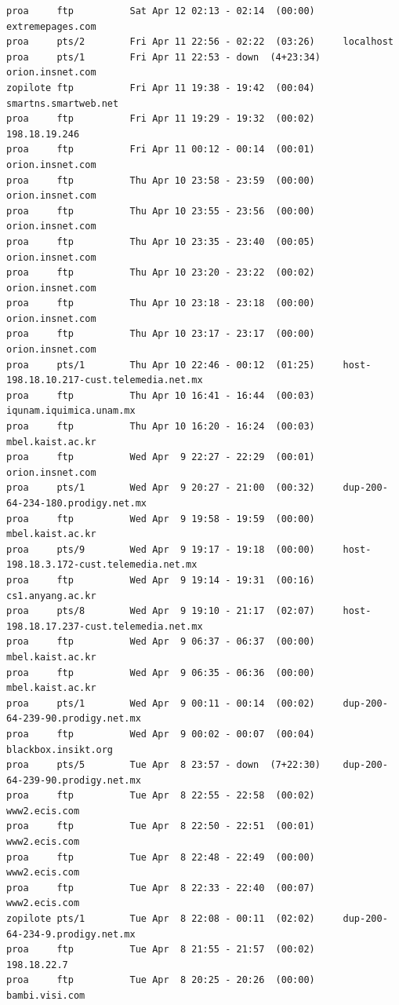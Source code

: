 \begin{lstlisting}[style=terminal]
proa     ftp          Sat Apr 12 02:13 - 02:14  (00:00)     extremepages.com
proa     pts/2        Fri Apr 11 22:56 - 02:22  (03:26)     localhost
proa     pts/1        Fri Apr 11 22:53 - down  (4+23:34)    orion.insnet.com
zopilote ftp          Fri Apr 11 19:38 - 19:42  (00:04)     smartns.smartweb.net
proa     ftp          Fri Apr 11 19:29 - 19:32  (00:02)     198.18.19.246
proa     ftp          Fri Apr 11 00:12 - 00:14  (00:01)     orion.insnet.com
proa     ftp          Thu Apr 10 23:58 - 23:59  (00:00)     orion.insnet.com
proa     ftp          Thu Apr 10 23:55 - 23:56  (00:00)     orion.insnet.com
proa     ftp          Thu Apr 10 23:35 - 23:40  (00:05)     orion.insnet.com
proa     ftp          Thu Apr 10 23:20 - 23:22  (00:02)     orion.insnet.com
proa     ftp          Thu Apr 10 23:18 - 23:18  (00:00)     orion.insnet.com
proa     ftp          Thu Apr 10 23:17 - 23:17  (00:00)     orion.insnet.com
proa     pts/1        Thu Apr 10 22:46 - 00:12  (01:25)     host-198.18.10.217-cust.telemedia.net.mx
proa     ftp          Thu Apr 10 16:41 - 16:44  (00:03)     iqunam.iquimica.unam.mx
proa     ftp          Thu Apr 10 16:20 - 16:24  (00:03)     mbel.kaist.ac.kr
proa     ftp          Wed Apr  9 22:27 - 22:29  (00:01)     orion.insnet.com
proa     pts/1        Wed Apr  9 20:27 - 21:00  (00:32)     dup-200-64-234-180.prodigy.net.mx
proa     ftp          Wed Apr  9 19:58 - 19:59  (00:00)     mbel.kaist.ac.kr
proa     pts/9        Wed Apr  9 19:17 - 19:18  (00:00)     host-198.18.3.172-cust.telemedia.net.mx
proa     ftp          Wed Apr  9 19:14 - 19:31  (00:16)     cs1.anyang.ac.kr
proa     pts/8        Wed Apr  9 19:10 - 21:17  (02:07)     host-198.18.17.237-cust.telemedia.net.mx
proa     ftp          Wed Apr  9 06:37 - 06:37  (00:00)     mbel.kaist.ac.kr
proa     ftp          Wed Apr  9 06:35 - 06:36  (00:00)     mbel.kaist.ac.kr
proa     pts/1        Wed Apr  9 00:11 - 00:14  (00:02)     dup-200-64-239-90.prodigy.net.mx
proa     ftp          Wed Apr  9 00:02 - 00:07  (00:04)     blackbox.insikt.org
proa     pts/5        Tue Apr  8 23:57 - down  (7+22:30)    dup-200-64-239-90.prodigy.net.mx
proa     ftp          Tue Apr  8 22:55 - 22:58  (00:02)     www2.ecis.com
proa     ftp          Tue Apr  8 22:50 - 22:51  (00:01)     www2.ecis.com
proa     ftp          Tue Apr  8 22:48 - 22:49  (00:00)     www2.ecis.com
proa     ftp          Tue Apr  8 22:33 - 22:40  (00:07)     www2.ecis.com
zopilote pts/1        Tue Apr  8 22:08 - 00:11  (02:02)     dup-200-64-234-9.prodigy.net.mx
proa     ftp          Tue Apr  8 21:55 - 21:57  (00:02)     198.18.22.7
proa     ftp          Tue Apr  8 20:25 - 20:26  (00:00)     bambi.visi.com

\end{lstlisting}
